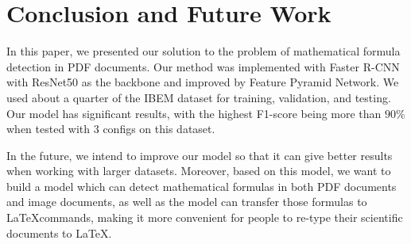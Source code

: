 \section{Conclusion and Future Work}
In this paper, we presented our solution to the problem of mathematical formula detection in PDF documents. Our method was implemented with Faster R-CNN with ResNet50 as the backbone and improved by Feature Pyramid Network. We used about a quarter of the IBEM dataset for training, validation, and testing. Our model has significant results, with the highest F1-score being more than $90\%$ when tested with 3 configs on this dataset.

In the future, we intend to improve our model so that it can give better results when working with larger datasets. Moreover, based on this model, we want to build a model which can detect mathematical formulas in both PDF documents and image documents, as well as the model can transfer those formulas to \LaTeX commands, making it more convenient for people to re-type their scientific documents to \LaTeX.